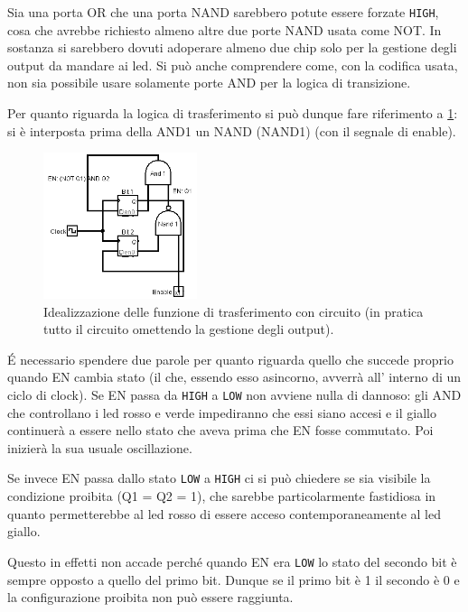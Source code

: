 \documentclass[a4paper,10pt]{article}
\def\code#1{\texttt{#1}}
\begin{document}
Sia una porta OR che una porta NAND sarebbero potute essere forzate \code{HIGH}, cosa che avrebbe richiesto almeno altre due porte NAND usata come NOT. In sostanza si sarebbero dovuti adoperare almeno due chip solo per la gestione degli output da mandare ai led. Si può anche comprendere come, con la codifica usata, non sia possibile usare solamente porte AND per la logica di transizione.
\newline
  
Per quanto riguarda la logica di trasferimento si può dunque fare riferimento a \cref{fig:solologica}: si è interposta prima della AND1 un NAND (NAND1) (con il segnale di enable). 


\begin{figure}[H]
	\centering
	\includegraphics[width=0.4\textwidth]{../grafici/solologica1.png}
	\caption{Idealizzazione delle funzione di trasferimento con circuito (in pratica tutto il circuito omettendo la gestione degli output).}
	\label{fig:solologica}
\end{figure}



\'E necessario spendere due parole per quanto riguarda quello che succede proprio quando EN cambia stato (il che, essendo esso asincorno, avverrà all' interno di un ciclo di clock). Se EN passa da \code{HIGH} a \code{LOW} non avviene nulla di dannoso: gli AND che controllano i led rosso e verde impediranno che essi siano accesi e il giallo continuerà a essere nello stato che aveva prima che EN fosse commutato. Poi inizierà la sua usuale oscillazione.

Se invece  EN passa dallo stato \code{LOW} a \code{HIGH} ci si può chiedere se sia visibile la condizione proibita (Q1 = Q2 = 1), che sarebbe particolarmente fastidiosa in quanto permetterebbe al led rosso di essere acceso contemporaneamente al led giallo. 

Questo in effetti non accade perché quando EN era \code{LOW} lo stato del secondo bit è sempre opposto a quello del primo bit. Dunque se il primo bit è 1 il secondo è 0 e la configurazione proibita non può essere raggiunta.
\end{document}
